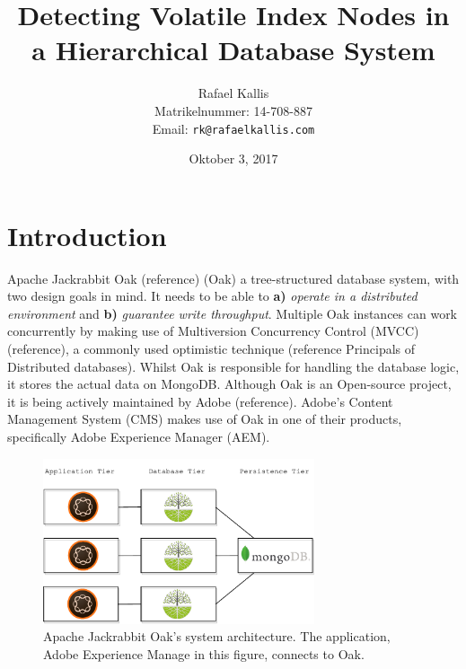 \documentclass[abstracton,12pt]{scrreprt}
\title{Detecting Volatile Index Nodes in a Hierarchical Database System}
\author{
  Rafael Kallis\\[-5pt]
  \scriptsize Matrikelnummer: 14-708-887\\[-5pt]
  \scriptsize Email: \texttt{rk@rafaelkallis.com}
}
\date{\vspace*{2cm}Oktober 3, 2017}
\begin{document}
\maketitle





\chapter{Introduction}
 

Apache Jackrabbit Oak (reference) (Oak) a tree-structured database system, with two design goals in mind.
It needs to be able to \textbf{a)} \textit{operate in a distributed environment} and \textbf{b)} \textit{guarantee write throughput}.
Multiple Oak instances can work concurrently by making use of Multiversion Concurrency Control (MVCC) (reference), a commonly used optimistic technique (reference Principals of Distributed databases).
Whilst Oak is responsible for handling the database logic, it stores the actual data on MongoDB.
Although Oak is an Open-source project, it is being actively maintained by Adobe (reference).
Adobe's Content Management System (CMS) makes use of Oak in one of their products, specifically Adobe Experience Manager (AEM).

\begin{figure}[h]
    \centering
    \includegraphics[width=8cm]{architecture}
    \caption{Apache Jackrabbit Oak's system architecture. The application, Adobe Experience Manage in this figure, connects to Oak.}
    \label{fig:architecture}
\end{figure}
\end{document}
